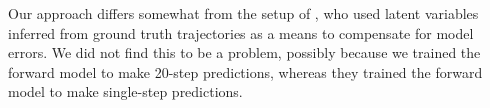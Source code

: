 \documentclass{article} %
\begin{document}
    Our approach differs somewhat from the setup of \citep{SVG}, who used latent variables inferred from ground truth trajectories as a means to compensate for model errors. We did not find this to be a problem, possibly because we trained the forward model to make 20-step predictions, whereas they trained the forward model to make single-step predictions.
\end{document}
